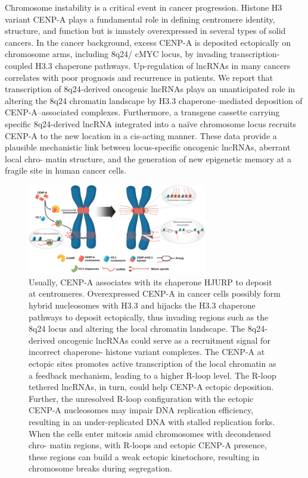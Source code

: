 Chromosome instability is a critical event in cancer progression. Histone H3 variant CENP-A plays a fundamental role in defining centromere identity, structure, and function but is innately overexpressed in several types of solid cancers. In the cancer background, excess CENP-A is deposited ectopically on chromosome arms, including 8q24/ cMYC locus, by invading transcription-coupled H3.3 chaperone pathways. Up-regulation of lncRNAs in many cancers correlates with poor prognosis and recurrence in patients. We report that transcription of 8q24-derived oncogenic lncRNAs plays an unanticipated role in altering the 8q24 chromatin landscape by H3.3 chaperone–mediated deposition of CENP-A–associated complexes. Furthermore, a transgene cassette carrying specific 8q24-derived lncRNA integrated into a naïve chromosome locus recruits CENP-A to the new location in a cis-acting manner. These data provide a plausible mechanistic link between locus-specific oncogenic lncRNAs, aberrant local chro- matin structure, and the generation of new epigenetic memory at a fragile site in human cancer cells.

\begin{figure}
\centering
\includegraphics[width=0.7\textwidth]{../_resources/cenp.png}
\caption{Usually, CENP-A associates with its chaperone HJURP to deposit at centromeres. Overexpressed CENP-A in cancer cells possibly form hybrid nucleosomes with H3.3 and hijacks the H3.3 chaperone pathways to deposit ectopically, thus invading regions such as the 8q24 locus and altering the local chromatin landscape. The 8q24-derived oncogenic lncRNAs could serve as a recruitment signal for incorrect chaperone- histone variant complexes. The CENP-A at ectopic sites promotes active transcription of the local chromatin as a feedback mechanism, leading to a higher R-loop level. The R-loop tethered lncRNAs, in turn, could help CENP-A ectopic deposition. Further, the unresolved R-loop configuration with the ectopic CENP-A nucleosomes may impair DNA replication efficiency, resulting in an under-replicated DNA with stalled replication forks. When the cells enter mitosis amid chromosomes with decondensed chro- matin regions, with R-loops and ectopic CENP-A presence, these regions can build a weak ectopic kinetochore, resulting in chromosome breaks during segregation.}
\end{figure}


